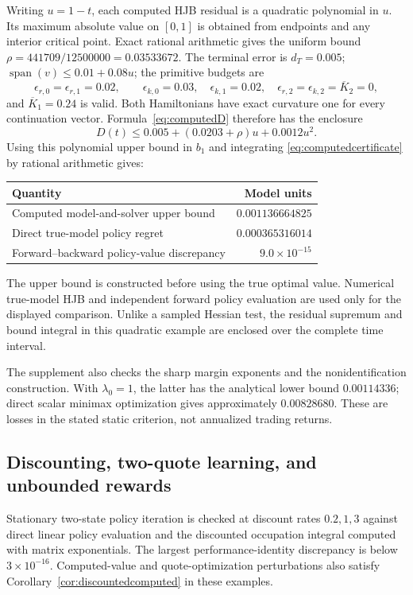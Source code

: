 \documentclass[11pt]{article}
\theoremstyle{plain}
\theoremstyle{definition}
\theoremstyle{remark}
\DeclareMathOperator{\spn}{span}
\begin{document}
Writing \(u=1-t\), each computed HJB residual is a quadratic
polynomial in \(u\). Its maximum absolute value on \([0,1]\) is
obtained from endpoints and any interior critical point. Exact
rational arithmetic gives the uniform bound
\(\rho=441709/12500000=0.03533672\).
The terminal error is \(d_T=0.005\);
\(\spn(v)\le0.01+0.08u\); the primitive budgets are
\[
\epsilon_{r,0}=\epsilon_{r,1}=0.02,\qquad
\epsilon_{k,0}=0.03,\quad\epsilon_{k,1}=0.02,\quad
\epsilon_{r,2}=\epsilon_{k,2}=\overline K_2=0,
\]
and \(\overline K_1=0.24\) is valid.
Both Hamiltonians have exact curvature one for every continuation
vector. Formula~\eqref{eq:computedD} therefore has the enclosure
\[
D(t)\le
0.005+(0.0203+\rho)u+0.0012u^2.
\]
Using this polynomial upper bound in \(b_1\) and integrating
\eqref{eq:computedcertificate} by rational arithmetic gives:
\begin{center}
\begin{tabular}{@{}lr@{}}
\toprule
Quantity&Model units\\
\midrule
Computed model-and-solver upper bound&\(0.001136664825\)\\
Direct true-model policy regret&\(0.000365316014\)\\
Forward--backward policy-value discrepancy&\(9.0\times10^{-15}\)\\
\bottomrule
\end{tabular}
\end{center}
The upper bound is constructed before using the true optimal value.
Numerical true-model HJB and independent forward policy evaluation
are used only for the displayed comparison. Unlike a sampled
Hessian test, the residual supremum and bound integral in this
quadratic example are enclosed over the complete time interval.

The supplement also checks the sharp margin exponents and the
nonidentification construction. With \(\lambda_0=1\), the latter
has the analytical lower bound \(0.00114336\); direct scalar
minimax optimization gives approximately \(0.00828680\).
These are losses in the stated static criterion, not annualized
trading returns.

\subsection{Discounting, two-quote learning, and unbounded rewards}

Stationary two-state policy iteration is checked at discount rates
\(0.2,1,3\) against direct linear policy evaluation and the discounted
occupation integral computed with matrix exponentials. The largest
performance-identity discrepancy is below \(3\times10^{-16}\).
Computed-value and quote-optimization perturbations also satisfy
Corollary~\ref{cor:discountedcomputed} in these examples.
\end{document}
